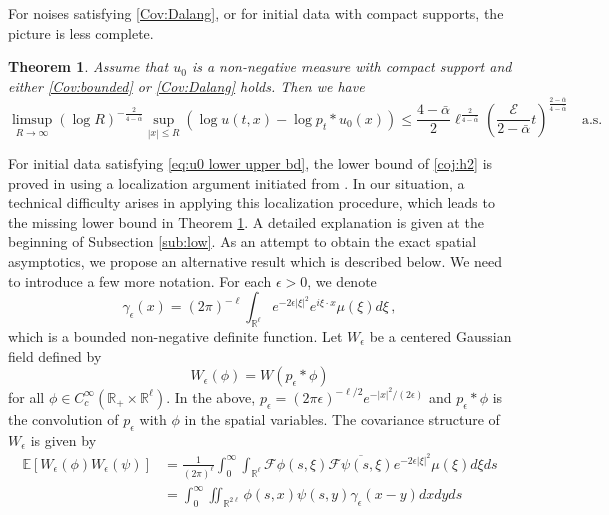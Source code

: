\documentclass[12pt,reqno]{amsart}
\newtheorem{theorem}{Theorem}[section]
\theoremstyle{remark}
\newcommand{\1}{\mathbf{1}}
\def\RR{\mathbb{R}}
\def\EE{\mathbb{E}}
\def\cee{{\mathcal E}}
\def\cff{{\mathcal F}}
\def\lt{\left}
\def\rt{\right}
\begin{document}
For noises satisfying \ref{Cov:Dalang}, or for initial data with compact supports, the picture is less complete. 
	\begin{theorem}\label{thm:H23Z}
		Assume that $u_0$ is a non-negative measure with compact support and either \ref{Cov:bounded} or \ref{Cov:Dalang} holds. Then we have
\begin{equation}\label{lim:Zspatial}
			\limsup_{R\to\infty}(\log R)^{-\frac2{4- \bar{\alpha}}}\sup_{|x|\le R}\lt(\log u(t,x)-\log p_t*u_0(x) \rt)\leq\frac{4- \bar{\alpha}}2\ell^{\frac2{4- \bar{\alpha}}} \lt(\frac{\cee}{2- \bar{\alpha}}t \rt)^{\frac{2- \bar{\alpha}}{4- \bar{\alpha}}} \quad \mathrm{a.s.}
		\end{equation}		 		 
	\end{theorem}
	For initial data satisfying \eqref{eq:u0 lower upper bd}, the lower bound of \eqref{coj:h2} is proved in \cite{MR3474477} using a localization argument initiated from \cite{MR3098071}. In our situation, a technical difficulty arises in applying this localization procedure, 
	which leads to the missing lower bound in Theorem \ref{thm:H23Z}. A detailed explanation is given at the beginning of Subsection \ref{sub:low}. As an attempt to obtain the exact spatial asymptotics, we propose an alternative result which is described below. We need to introduce a few more notation.
		For each $\epsilon>0$, we denote 
	\begin{equation}
		\gamma_ \epsilon(x)=(2 \pi)^{-\ell}\int_{\RR^\ell}e^{- 2\epsilon|\xi|^2}e^{i \xi\cdot x}\mu(\xi)d \xi\,,
	\end{equation}
	which is a bounded non-negative definite function. Let $W_ \epsilon$ be a centered Gaussian field defined by
	\begin{equation}\label{eqn:Wep}
		W_ \epsilon(\phi)=W(p_{\epsilon}*\phi)
	\end{equation}
	for all $\phi\in C_{c}^{\infty}(\RR_+\times\RR^\ell)$. In the above, $p_ \epsilon=(2 \pi \epsilon)^{-\ell/2}e^{-|x|^2/(2 \epsilon)}$ and $p_{\epsilon}*\phi$ is the convolution of $p_{\epsilon}$ with $\phi$ in the spatial variables. The covariance structure of $W_ \epsilon$ is given by
	\begin{align}
		\EE [W_ \epsilon(\phi)W_ \epsilon(\psi)]&=\frac1{(2 \pi)^\ell} \int_0^\infty\int_{\RR^\ell} \cff\phi(s,\xi)\overline{\cff\psi(s,\xi)}e^{-2 \epsilon|\xi|^2}\mu( \xi) d \xi ds
		\nonumber\\&=\int_0^\infty\iint_{\RR^{2\ell}} \phi(s,x)\psi(s,y)\gamma_ \epsilon(x-y)dxdyds\label{Wep.cov}
	\end{align}	
\end{document}
